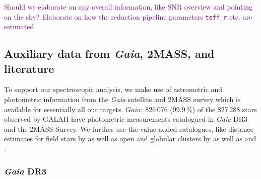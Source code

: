 \documentclass[
  journal=pasa,
  manuscript=research-paper, %
  year=2023,
  volume=37
]{cup-journal}
\newcommand{\SB}[1]{{\textcolor{purple}{#1}}}
\newcommand{\Gaia}{\textit{Gaia}\xspace}
\begin{document}
\SB{Should we elaborate on any overall information, like SNR overview and pointing on the sky?}
\SB{Elaborate on how the reduction pipeline parameters \texttt{teff\_r} etc. are estimated.}

\subsection{Auxiliary data from \Gaia, 2MASS, and literature} \label{sec:non-spec_data}


To support our spectroscopic analysis, we make use of astrometric and photometric information from the \Gaia satellite \citep{Gaia-Collaboration2016} and 2MASS survey \citep{Skrutskie2006} which is available for essentially all our targets. $Gaia$: 826\,076 (99.9\,\%) of the 827\,288 stars observed by GALAH have photometric measurements catalogued in \Gaia DR3 and the 2MASS Survey. We further use the value-added catalogues, like distance estimates for field stars by \citep{BailerJones2021} as well as open and globular clusters by \citet{CantatGaudin2020} as well as \citet{Vasiliev2021} and \citet{Baumgardt2021}.

\subsubsection{\Gaia DR3}
\end{document}
